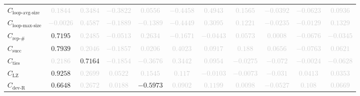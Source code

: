 \documentclass{standalone}
\newcommand{\loopavgsizename}{\text{loop-avg-size}}
\newcommand{\loopavgsize}{C_{\loopavgsizename}}
\newcommand{\loopmaxsizename}{\text{loop-max-size}}
\newcommand{\loopmaxsize}{C_{\loopmaxsizename}}
\newcommand{\repnumname}{\text{rep-\#}}
\newcommand{\repnum}{C_{\repnumname}}
\newcommand{\numberofneighborhoodsname}{\text{succ}}
\newcommand{\numberofneighborhoods}{C_{\numberofneighborhoodsname}}
\newcommand{\numberoftiesname}{\text{ties}}
\newcommand{\numberofties}{C_{\numberoftiesname}}
\newcommand{\lempelzivname}{\text{LZ}}
\newcommand{\lempelziv}{C_{\lempelzivname}}
\newcommand{\deviationfromrandomname}{\text{dev-R}}
\newcommand{\deviationfromrandom}{C_{\deviationfromrandomname}}
\begin{document}
\begin{tabular}{lcccccccccc}
$\loopavgsize$ & \textcolor{lightgray}{$0.1844$} & \textcolor{lightgray}{$0.3484$} & \textcolor{lightgray}{$-0.3822$} & \textcolor{lightgray}{$0.0556$} & \textcolor{lightgray}{$-0.4458$} & \textcolor{lightgray}{$0.4943$} & \textcolor{lightgray}{$0.1565$} & \textcolor{lightgray}{$-0.0392$} & \textcolor{lightgray}{$-0.0623$} & \textcolor{lightgray}{$0.0936$} \\ 
$\loopmaxsize$ & \textcolor{lightgray}{$-0.0026$} & \textcolor{lightgray}{$0.4587$} & \textcolor{lightgray}{$-0.1889$} & \textcolor{lightgray}{$-0.1389$} & \textcolor{lightgray}{$-0.4449$} & \textcolor{lightgray}{$0.3095$} & \textcolor{lightgray}{$0.1221$} & \textcolor{lightgray}{$-0.0235$} & \textcolor{lightgray}{$-0.0129$} & \textcolor{lightgray}{$0.1329$} \\ 
$\repnum$ & $0.7195$ & \textcolor{lightgray}{$0.2485$} & \textcolor{lightgray}{$-0.0513$} & \textcolor{lightgray}{$0.2634$} & \textcolor{lightgray}{$-0.1671$} & \textcolor{lightgray}{$-0.0443$} & \textcolor{lightgray}{$0.0573$} & \textcolor{lightgray}{$0.0008$} & \textcolor{lightgray}{$-0.0676$} & \textcolor{lightgray}{$-0.0345$} \\ 
$\numberofneighborhoods$ & $0.7939$ & \textcolor{lightgray}{$0.2046$} & \textcolor{lightgray}{$-0.1857$} & \textcolor{lightgray}{$0.0206$} & \textcolor{lightgray}{$0.4023$} & \textcolor{lightgray}{$0.0917$} & \textcolor{lightgray}{$0.188$} & \textcolor{lightgray}{$0.0656$} & \textcolor{lightgray}{$-0.0763$} & \textcolor{lightgray}{$0.0621$} \\ 
$\numberofties$ & \textcolor{lightgray}{$0.2186$} & $0.7164$ & \textcolor{lightgray}{$-0.1854$} & \textcolor{lightgray}{$-0.3676$} & \textcolor{lightgray}{$0.3442$} & \textcolor{lightgray}{$0.0954$} & \textcolor{lightgray}{$-0.0275$} & \textcolor{lightgray}{$-0.072$} & \textcolor{lightgray}{$-0.0024$} & \textcolor{lightgray}{$-0.0628$} \\ 
$\lempelziv$ & $0.9258$ & \textcolor{lightgray}{$0.2699$} & \textcolor{lightgray}{$0.0522$} & \textcolor{lightgray}{$0.1545$} & \textcolor{lightgray}{$0.117$} & \textcolor{lightgray}{$-0.0103$} & \textcolor{lightgray}{$-0.0073$} & \textcolor{lightgray}{$-0.031$} & \textcolor{lightgray}{$0.0413$} & \textcolor{lightgray}{$0.0353$} \\ 
$\deviationfromrandom$ & $0.6648$ & \textcolor{lightgray}{$0.2672$} & \textcolor{lightgray}{$0.0188$} & $-0.5973$ & \textcolor{lightgray}{$0.0902$} & \textcolor{lightgray}{$0.1199$} & \textcolor{lightgray}{$0.0098$} & \textcolor{lightgray}{$-0.0527$} & \textcolor{lightgray}{$0.108$} & \textcolor{lightgray}{$0.0669$} \\ 

\end{tabular}
\end{document}
